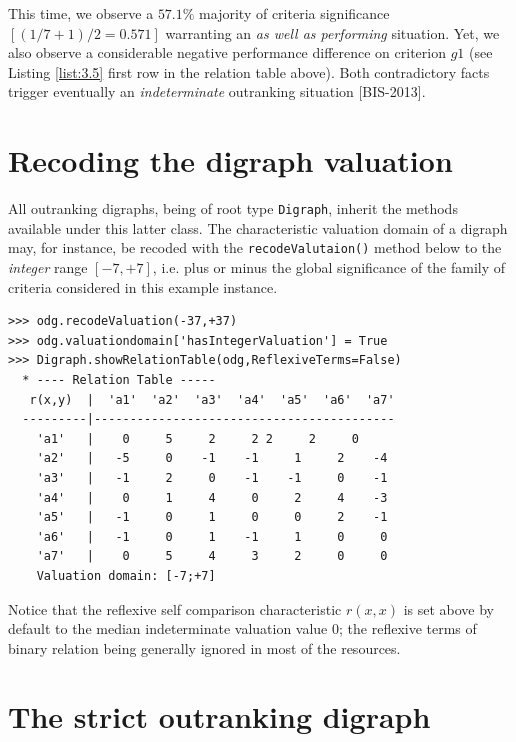 This time, we observe a $57.1\%$ majority of criteria significance $[(1/7 + 1)/2 = 0.571]$ warranting an {\em as well as performing\/} situation. Yet, we also observe a considerable negative performance difference on criterion $g1$ (see Listing \ref{list:3.5} first row in the relation table above). Both contradictory facts trigger eventually an \emph{indeterminate} outranking situation [BIS-2013]. 

\section{Recoding the digraph valuation}
\label{sec:3.4}

All outranking digraphs, being of root type {\tt Digraph}, inherit the methods available under this latter class. The characteristic valuation domain of a digraph may, for instance,  be recoded with the {\tt recodeValutaion()} method below to the {\em integer\/} range $[-7,+7]$, i.e. plus or minus the global significance of the family of criteria considered in this example instance.

\begin{lstlisting}[caption={Recoding the digraph valuation},label=list:3.7]
>>> odg.recodeValuation(-37,+37)
>>> odg.valuationdomain['hasIntegerValuation'] = True
>>> Digraph.showRelationTable(odg,ReflexiveTerms=False)
  * ---- Relation Table -----
   r(x,y)  |  'a1'  'a2'  'a3'  'a4'  'a5'  'a6'  'a7'	  
  ---------|------------------------------------------
    'a1'   |    0     5     2     2	2     2     0	 
    'a2'   |   -5     0    -1	 -1     1     2    -4	 
    'a3'   |   -1     2     0	 -1    -1     0    -1	 
    'a4'   |    0     1     4	  0     2     4    -3	 
    'a5'   |   -1     0     1	  0     0     2    -1	 
    'a6'   |   -1     0     1	 -1     1     0     0	 
    'a7'   |    0     5     4	  3     2     0     0	 
    Valuation domain: [-7;+7]
\end{lstlisting}

\begin{svgraybox}
 Notice that the reflexive self comparison characteristic $r(x,x)$ is set above by default to the median indeterminate valuation value $0$; the reflexive terms of binary relation being generally ignored in most of the  resources. 
\end{svgraybox}

\section{The strict outranking digraph}
\label{sec:3.5}

